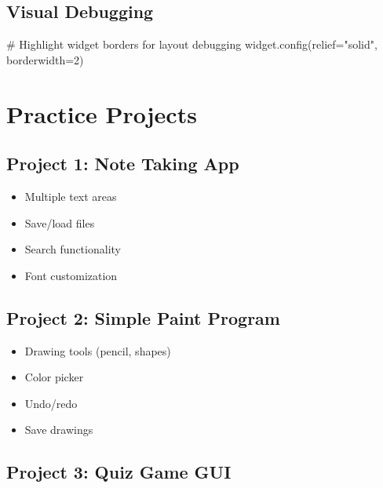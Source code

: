 \documentclass[
  letterpaper,
  DIV=11,
  numbers=noendperiod,
  oneside]{scrreprt}
\newenvironment{Shaded}{}{}
\newcommand{\CommentTok}[1]{\textcolor[rgb]{0.42,0.45,0.49}{#1}}
\newcommand{\DecValTok}[1]{\textcolor[rgb]{0.00,0.36,0.77}{#1}}
\newcommand{\NormalTok}[1]{\textcolor[rgb]{0.14,0.16,0.18}{#1}}
\newcommand{\OperatorTok}[1]{\textcolor[rgb]{0.14,0.16,0.18}{#1}}
\newcommand{\StringTok}[1]{\textcolor[rgb]{0.01,0.18,0.38}{#1}}
\providecommand{\tightlist}{%
  \setlength{\itemsep}{0pt}\setlength{\parskip}{0pt}}\usepackage{longtable,booktabs,array}
\begin{document}
\subsection{Visual Debugging}\label{visual-debugging}

\begin{Shaded}
\begin{Highlighting}[]
\CommentTok{\# Highlight widget borders for layout debugging}
\NormalTok{widget.config(relief}\OperatorTok{=}\StringTok{"solid"}\NormalTok{, borderwidth}\OperatorTok{=}\DecValTok{2}\NormalTok{)}
\end{Highlighting}
\end{Shaded}

\section{Practice Projects}\label{practice-projects-2}

\subsection{Project 1: Note Taking App}\label{project-1-note-taking-app}

\begin{itemize}
\tightlist
\item
  Multiple text areas
\item
  Save/load files
\item
  Search functionality
\item
  Font customization
\end{itemize}

\subsection{Project 2: Simple Paint
Program}\label{project-2-simple-paint-program}

\begin{itemize}
\tightlist
\item
  Drawing tools (pencil, shapes)
\item
  Color picker
\item
  Undo/redo
\item
  Save drawings
\end{itemize}

\subsection{Project 3: Quiz Game GUI}\label{project-3-quiz-game-gui}
\end{document}
